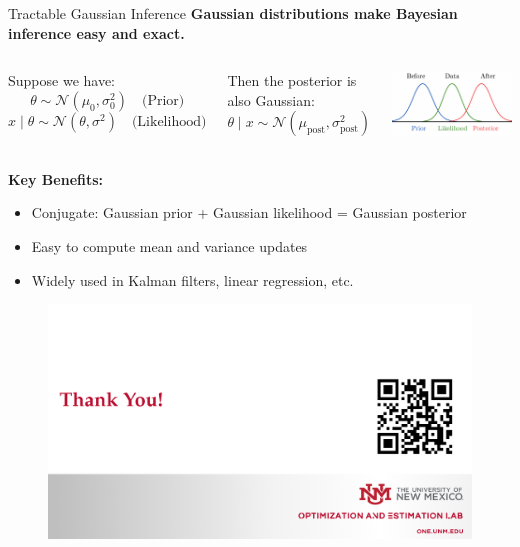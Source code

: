 \documentclass[handout,aspectratio=169]{beamer}
\begin{document}
\begin{frame}{Tractable Gaussian Inference}
  \textbf{Gaussian distributions make Bayesian inference easy and exact.}

  \vspace{1em}
  \begin{columns}
Suppose we have:
  \[
    \theta \sim \mathcal{N}(\mu_0, \sigma_0^2) \quad \text{(Prior)}
  \]
  \[
    x \mid \theta \sim \mathcal{N}(\theta, \sigma^2) \quad \text{(Likelihood)}
  \]

  \vspace{1em}
  Then the posterior is also Gaussian:
  \[
    \theta \mid x \sim \mathcal{N}(\mu_{\text{post}}, \sigma_{\text{post}}^2)
  \]
  
    \includegraphics[width=0.8\linewidth]{figs/gaussian.png}
\end{columns}
  

  \vspace{0.5em}
  \textbf{Key Benefits:}
  \begin{itemize}
    \item Conjugate: Gaussian prior + Gaussian likelihood = Gaussian posterior
    \item Easy to compute mean and variance updates
    \item Widely used in Kalman filters, linear regression, etc.
  \end{itemize}

\end{frame}


\begin{frame}
	\begin{figure}[htbp]
		\centering
		\includegraphics[width=\textwidth]{figs/thanks.png}
	\end{figure}
\end{frame}
\end{document}
